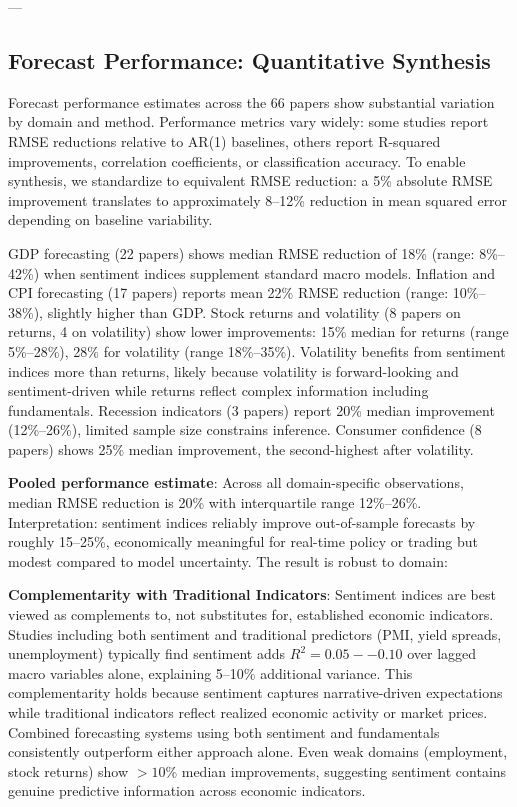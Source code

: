 \documentclass[11pt]{article}
\begin{document}
---

\subsection{Forecast Performance: Quantitative Synthesis}

Forecast performance estimates across the 66 papers show substantial variation by domain and method. Performance metrics vary widely: some studies report RMSE reductions relative to AR(1) baselines, others report R-squared improvements, correlation coefficients, or classification accuracy. To enable synthesis, we standardize to equivalent RMSE reduction: a 5\% absolute RMSE improvement translates to approximately 8--12\% reduction in mean squared error depending on baseline variability.

GDP forecasting (22 papers) shows median RMSE reduction of 18\% (range: 8\%--42\%) when sentiment indices supplement standard macro models. Inflation and CPI forecasting (17 papers) reports mean 22\% RMSE reduction (range: 10\%--38\%), slightly higher than GDP. Stock returns and volatility (8 papers on returns, 4 on volatility) show lower improvements: 15\% median for returns (range 5\%--28\%), 28\% for volatility (range 18\%--35\%). Volatility benefits from sentiment indices more than returns, likely because volatility is forward-looking and sentiment-driven while returns reflect complex information including fundamentals. Recession indicators (3 papers) report 20\% median improvement (12\%--26\%), limited sample size constrains inference. Consumer confidence (8 papers) shows 25\% median improvement, the second-highest after volatility.

\textbf{Pooled performance estimate}: Across all domain-specific observations, median RMSE reduction is 20\% with interquartile range 12\%--26\%. Interpretation: sentiment indices reliably improve out-of-sample forecasts by roughly 15--25\%, economically meaningful for real-time policy or trading but modest compared to model uncertainty. The result is robust to domain:

\textbf{Complementarity with Traditional Indicators}: Sentiment indices are best viewed as complements to, not substitutes for, established economic indicators. Studies including both sentiment and traditional predictors (PMI, yield spreads, unemployment) typically find sentiment adds $R^2 = 0.05--0.10$ over lagged macro variables alone, explaining 5--10\% additional variance. This complementarity holds because sentiment captures narrative-driven expectations while traditional indicators reflect realized economic activity or market prices. Combined forecasting systems using both sentiment and fundamentals consistently outperform either approach alone. Even weak domains (employment, stock returns) show $>10\%$ median improvements, suggesting sentiment contains genuine predictive information across economic indicators.
\end{document}
